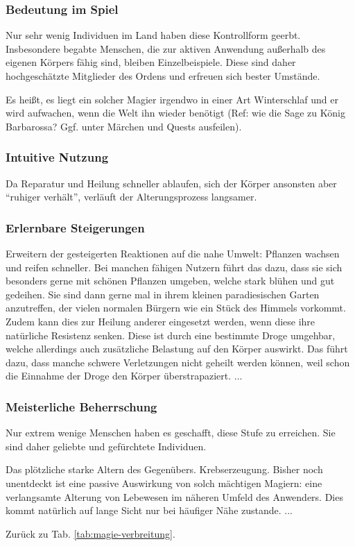 \subsubsection{Bedeutung im Spiel}
Nur sehr wenig Individuen im Land haben diese Kontrollform geerbt.
Insbesondere begabte Menschen, die zur aktiven Anwendung außerhalb des eigenen Körpers fähig sind, bleiben Einzelbeispiele.
Diese sind daher hochgeschätzte Mitglieder des Ordens und erfreuen sich bester Umstände.

Es heißt, es liegt ein solcher Magier irgendwo in einer Art Winterschlaf und er wird aufwachen, wenn die Welt ihn wieder benötigt (Ref: wie die Sage zu König Barbarossa? Ggf. unter Märchen und Quests ausfeilen). %

\subsubsection{Intuitive Nutzung}
Da Reparatur und Heilung schneller ablaufen, sich der Körper ansonsten aber "`ruhiger verhält"', verläuft der Alterungsprozess langsamer.

\subsubsection{Erlernbare Steigerungen}
\begin{outline}
	\1 Erweitern der gesteigerten Reaktionen auf die nahe Umwelt: Pflanzen wachsen und reifen schneller.
	Bei manchen fähigen Nutzern führt das dazu, dass sie sich besonders gerne mit schönen Pflanzen umgeben, welche stark blühen und gut gedeihen.
	Sie sind dann gerne mal in ihrem kleinen paradiesischen Garten anzutreffen, der vielen normalen Bürgern wie ein Stück des Himmels vorkommt.
	\1 Zudem kann dies zur Heilung anderer eingesetzt werden, wenn diese ihre natürliche Resistenz senken.
	Diese ist durch eine bestimmte Droge umgehbar, welche allerdings auch zusätzliche Belastung auf den Körper auswirkt. %
	Das führt dazu, dass manche schwere Verletzungen nicht geheilt werden können, weil schon die Einnahme der Droge den Körper überstrapaziert.
	\1 ...
\end{outline}

\subsubsection{Meisterliche Beherrschung} 
Nur extrem wenige Menschen haben es geschafft, diese Stufe zu erreichen.
Sie sind daher geliebte und gefürchtete Individuen.
\begin{outline}
	\1 Das plötzliche starke Altern des Gegenübers.
	\1 Krebserzeugung.
	\1 Bisher noch unentdeckt ist eine passive Auswirkung von solch mächtigen Magiern: eine verlangsamte Alterung von Lebewesen im näheren Umfeld des Anwenders.
	Dies kommt natürlich auf lange Sicht nur bei häufiger Nähe zustande.
	\1 ...
\end{outline}
Zurück zu Tab. \ref{tab:magie-verbreitung}.



